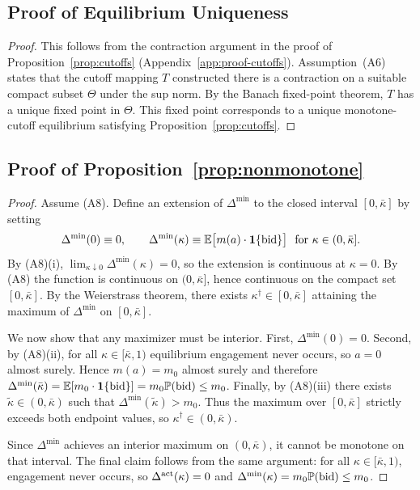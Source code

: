 \documentclass[11pt]{article}
\newcommand{\E}{\mathbb{E}}
\newcommand{\PP}{\mathbb{P}}
\newcommand{\1}{\mathbf{1}}
\begin{document}
\subsection{Proof of Equilibrium Uniqueness}
\label{app:proof-uniqueness}

\begin{proof}
This follows from the contraction argument in the proof of Proposition~\ref{prop:cutoffs} (Appendix~\ref{app:proof-cutoffs}). Assumption~\textup{(A6)} states that the cutoff mapping $T$ constructed there is a contraction on a suitable compact subset $\Theta$ under the sup norm. By the Banach fixed-point theorem, $T$ has a unique fixed point in $\Theta$. This fixed point corresponds to a unique monotone-cutoff equilibrium satisfying Proposition~\ref{prop:cutoffs}.
\end{proof}

\subsection{Proof of Proposition~\ref{prop:nonmonotone}}
\label{app:proof-nonmonotone}

\begin{proof}
Assume \textup{(A8)}. Define an extension of $\Delta^{\min}$ to the closed interval $[0,\bar{\kappa}]$ by setting
\[
\Delta^{\min}(0)\equiv 0,\qquad \Delta^{\min}(\kappa)\equiv \E\big[m(a)\cdot \1\{\textup{bid}\}\big]\ \text{ for }\kappa\in(0,\bar{\kappa}].
\]
By \textup{(A8)(i)}, $\lim_{\kappa\downarrow 0}\Delta^{\min}(\kappa)=0$, so the extension is continuous at $\kappa=0$. By \textup{(A8)} the function is continuous on $(0,\bar{\kappa}]$, hence continuous on the compact set $[0,\bar{\kappa}]$. By the Weierstrass theorem, there exists $\kappa^{\dagger}\in[0,\bar{\kappa}]$ attaining the maximum of $\Delta^{\min}$ on $[0,\bar{\kappa}]$.

We now show that any maximizer must be interior. First, $\Delta^{\min}(0)=0$. Second, by \textup{(A8)(ii)}, for all $\kappa\in[\bar{\kappa},1)$ equilibrium engagement never occurs, so $a=0$ almost surely. Hence $m(a)=m_0$ almost surely and therefore $\Delta^{\min}(\bar{\kappa})=\E[m_0\cdot \1\{\textup{bid}\}]=m_0\PP(\textup{bid})\le m_0$. Finally, by \textup{(A8)(iii)} there exists $\tilde{\kappa}\in(0,\bar{\kappa})$ such that $\Delta^{\min}(\tilde{\kappa})>m_0$. Thus the maximum over $[0,\bar{\kappa}]$ strictly exceeds both endpoint values, so $\kappa^{\dagger}\in(0,\bar{\kappa})$.

Since $\Delta^{\min}$ achieves an interior maximum on $(0,\bar{\kappa})$, it cannot be monotone on that interval. The final claim follows from the same argument: for all $\kappa\in[\bar{\kappa},1)$, engagement never occurs, so $\Delta^{\textup{act}}(\kappa)=0$ and $\Delta^{\min}(\kappa)=m_0\PP(\textup{bid})\le m_0$.
\end{proof}
\end{document}
